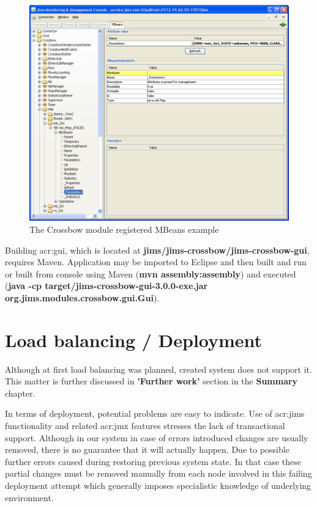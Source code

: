 \documentclass[11pt,openany]{book}
\begin{document}
      \begin{figure}[H]
        \centering
        \includegraphics[width=1.0\textwidth]{img/impl/jconsole.png}

        \caption{The Crossbow module registered MBeans example}
        \label{fig:impl:xbow-jconsole}
      \end{figure}

      Building \gls{acr:gui}, which is located at \textbf{jims/jims-crossbow/jims-crossbow-gui}, requires Maven.
      Application may be imported to Eclipse and then built and run or built from console using Maven (\textbf{mvn
      assembly:assembly}) and executed (\textbf{java -cp target/jims-crossbow-gui-3.0.0-exe.jar
      org.jims.modules.crossbow.gui.Gui}).


    \section{Load balancing / Deployment}
    \label{sec:impl:problems}

	  
		Although at first load balancing was planned, created system does not support it. This matter is further 
		discussed in \textbf{'Further work'} section in the \textbf{Summary} chapter.
		
		In terms of deployment, potential problems are easy to indicate. Use of \gls{acr:jims} functionality and related \gls{acr:jmx} 
		features stresses the lack of transactional support. Although in our system in case of errors introduced changes
		are usually removed, there is no guarantee that it will actually happen. Due to possible further errors caused during 
		restoring previous system state. In that case these partial changes must be removed manually from each node
		involved in this failing deployment attempt which generally imposes specialistic knowledge of underlying
    environment.  
\end{document}
